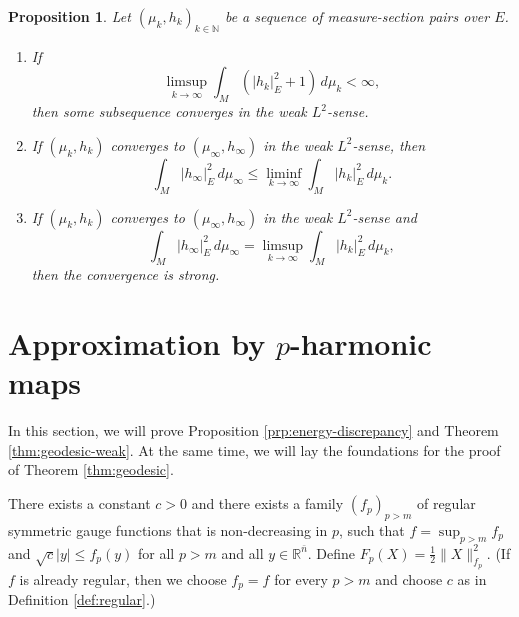 \documentclass[a4paper]{article}
\newcommand{\R}{\mathbb{R}}
\newcommand{\N}{\mathbb{N}}
\newcommand{\ndim}{{\bar{n}}}
\newtheorem{proposition}[theorem]{Proposition}
\theoremstyle{definition}
\theoremstyle{remark}
\begin{document}
\begin{proposition} \label{prp:Hutchinson}
Let $(\mu_k, h_k)_{k \in \N}$ be a sequence of measure-section pairs over $E$.
\begin{enumerate}
\item If
\[
\limsup_{k \to \infty} \int_M (|h_k|_E^2 + 1) \, d\mu_k < \infty,
\]
then some subsequence converges in the weak $L^2$-sense.
\item If $(\mu_k, h_k)$ converges to $(\mu_\infty, h_\infty)$ in the weak
$L^2$-sense, then
\[
\int_M |h_\infty|_E^2 \, d\mu_\infty \le \liminf_{k \to \infty} \int_M |h_k|_E^2 \, d\mu_k.
\]
\item If $(\mu_k, h_k)$ converges to $(\mu_\infty, h_\infty)$ in the weak
$L^2$-sense and
\[
\int_M |h_\infty|_E^2 \, d\mu_\infty = \limsup_{k \to \infty} \int_M |h_k|_E^2 \, d\mu_k,
\]
then the convergence is strong.
\end{enumerate}
\end{proposition}















\section{Approximation by $p$-harmonic maps} \label{sct:construction}

In this section, we will prove Proposition \ref{prp:energy-discrepancy} and
Theorem \ref{thm:geodesic-weak}. At the same time, we will lay the
foundations for the proof of  Theorem \ref{thm:geodesic}.

There exists a constant $c > 0$ and there exists a family $(f_p)_{p > m}$ of regular symmetric gauge functions
that is non-decreasing in $p$, such that $f = \sup_{p > m} f_p$ and $\sqrt{c} |y| \le f_p(y)$ for all
$p > m$ and all $y \in \R^\ndim$. Define
$F_p(X) = \frac{1}{2} \|X\|_{f_p}^2$. (If $f$ is already regular, then we choose $f_p = f$ for every $p > m$
and choose $c$ as in Definition \ref{def:regular}.)
\end{document}
